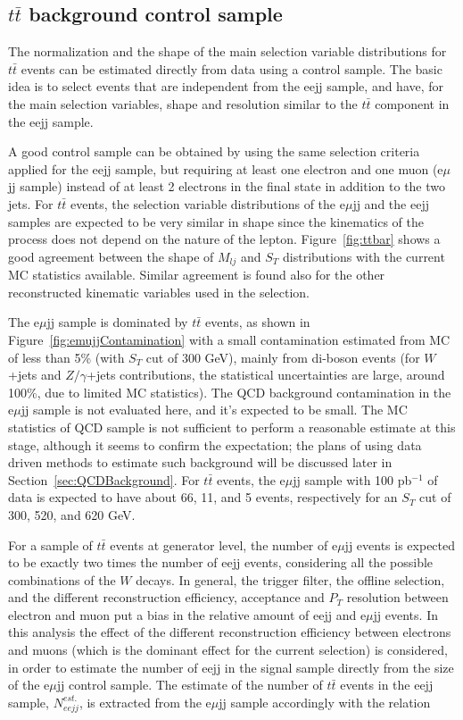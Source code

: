 \subsection{$t\bar{t}$ background control sample} \label{sec:ttbarControlSample}

The normalization and the shape of the main selection variable distributions for 
$t\bar{t}$ events can be estimated directly from data using a control sample. 
The basic idea is to select events that are independent from the eejj sample, and have, for the main selection variables, 
shape and resolution similar to the $t\bar{t}$ component in the eejj sample.

A good control sample can be obtained by using the same selection criteria applied for the eejj sample, but 
requiring at least one electron and one muon (e$\mu$jj sample) instead of at least 2 electrons 
in the final state in addition to the two jets. 
For $t\bar{t}$ events, the selection variable distributions of the e$\mu$jj and the eejj samples
are expected to be very similar in shape since the kinematics of the process does not depend 
on the nature of the lepton. Figure~\ref{fig:ttbar} shows a good agreement between 
the shape of $M_{lj}$ and $S_{T}$ distributions with the current MC statistics available. Similar agreement 
is found also for the other reconstructed kinematic variables used in the selection. 

The e$\mu$jj sample is dominated by $t\bar{t}$ events, as shown in Figure~\ref{fig:emujjContamination} 
with a small contamination estimated from MC of less than 5\% (with $S_{T}$ cut of 300 GeV), 
mainly from di-boson events (for $W$+jets and $Z/\gamma$+jets contributions, the statistical 
uncertainties are large, around 100\%, due to limited MC statistics). 
The QCD background contamination in the e$\mu$jj sample is not evaluated here, and it's expected to be small. 
The MC statistics of QCD sample is not sufficient to perform a reasonable estimate at this stage, although 
it seems to confirm the expectation; the plans of using data driven methods to estimate such background 
will be discussed later in Section~\ref{sec:QCDBackground}. 
For $t\bar{t}$ events, the e$\mu$jj sample with 100 pb$^{-1}$ of data 
is expected to have about 66, 11, and 5 events, respectively for an $S_{T}$ cut of 300, 520, and 620 GeV.

For a sample of $t\bar{t}$ events at generator level, the number of e$\mu$jj events is expected to be
exactly two times the number of eejj events, considering all the possible combinations of the $W$ decays.
In general, the trigger filter, the offline selection, and the different reconstruction efficiency,
acceptance and $P_{T}$ resolution between electron and muon put a bias in the relative amount of eejj 
and e$\mu$jj events. 
In this analysis the effect of the different reconstruction efficiency between electrons and muons 
(which is the dominant effect for the current selection) 
is considered, in order to estimate the number of eejj in the signal sample directly from 
the size of the e$\mu$jj control sample. The estimate of the number of $t\bar{t}$ events in the eejj sample, 
$N_{eejj}^{est.}$, is extracted from the e$\mu$jj sample accordingly with the relation 

